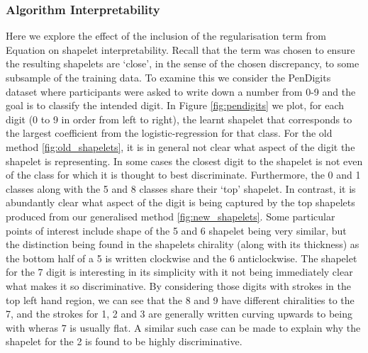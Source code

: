 \subsubsection{Algorithm Interpretability}
Here we explore the effect of the inclusion of the regularisation term from Equation \cite{eq:interpretable_reg} on shapelet interpretability. Recall that the term was chosen to ensure the resulting shapelets are `close', in the sense of the chosen discrepancy, to some subsample of the training data. To examine this we consider the PenDigits dataset where participants were asked to write down a number from 0-9 and the goal is to classify the intended digit. In Figure \ref{fig:pendigits} we plot, for each digit (0 to 9 in order from left to right), the learnt shapelet that corresponds to the largest coefficient from the logistic-regression for that class. For the old method \ref{fig:old_shapelets}, it is in general not clear what aspect of the digit the shapelet is representing. In some cases the closest digit to the shapelet is not even of the class for which it is thought to best discriminate. Furthermore, the 0 and 1 classes along with the 5 and 8 classes share their `top' shapelet. In contrast, it is abundantly clear what aspect of the digit is being captured by the top shapelets produced from our generalised method \ref{fig:new_shapelets}. Some particular points of interest include shape of the 5 and 6 shapelet being very similar, but the distinction being found in the shapelets chirality (along with its thickness) as the bottom half of a 5 is written clockwise and the 6 anticlockwise. The shapelet for the 7 digit is interesting in its simplicity with it not being immediately clear what makes it so discriminative. By considering those digits with strokes in the top left hand region, we can see that the 8 and 9 have different chiralities to the 7, and the strokes for 1, 2 and 3 are generally written curving upwards to being with wheras 7 is usually flat. A similar such case can be made to explain why the shapelet for the 2 is found to be highly discriminative.

